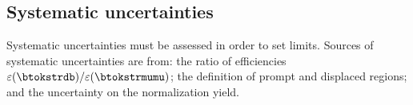 



\subsection{Systematic uncertainties}
Systematic uncertainties must be assessed in order to set limits.
Sources of systematic uncertainties are from:
the ratio of efficiencies $\varepsilon(\btokstrdb)/\varepsilon(\btokstrmumu)$;
the definition of prompt and displaced regions;
and the uncertainty on the \sm \btokstrmumu normalization yield.

